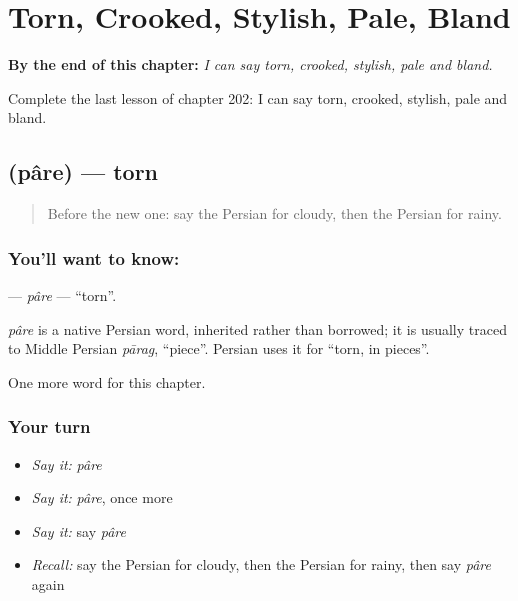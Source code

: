 
\chapter{Torn, Crooked, Stylish, Pale, Bland}
\label{ch:fa-torn-crooked-stylish-pale-bland}

\begin{chapteropening}
\textbf{By the end of this chapter:} \emph{I can say torn, crooked, stylish, pale and bland.}

Complete the last lesson of chapter 202: I can say torn, crooked, stylish, pale and bland.
\end{chapteropening}

\section[\texorpdfstring{\fa{پاره} (pâre)}{پاره (pâre)}]{ (pâre) — torn}

\label{lesson:FA-C202-pare}



\begin{quote}
Before the new one: say the Persian for cloudy, then the Persian for rainy.
\end{quote}

\subsection*{You'll want to know: }
\textbf{} — \emph{pâre} — \textquotedblleft{}torn\textquotedblright{}.

\begin{cousinweb}
\emph{pâre} is a native Persian word, inherited rather than borrowed; it is usually traced to Middle Persian \emph{pārag}, \textquotedblleft{}piece\textquotedblright{}. Persian uses it for \textquotedblleft{}torn, in pieces\textquotedblright{}.
\end{cousinweb}

\begin{grammarlens}[title={What you've built}]
One more word for this chapter.
\end{grammarlens}

\subsection*{Your turn}
\begin{itemize}
\raggedright
  \item \emph{Say it:} \emph{pâre}
  \item \emph{Say it:} \emph{pâre}, once more
  \item \emph{Say it:} say \emph{pâre}
  \item \emph{Recall:} say the Persian for cloudy, then the Persian for rainy, then say \emph{pâre} again
\end{itemize}

